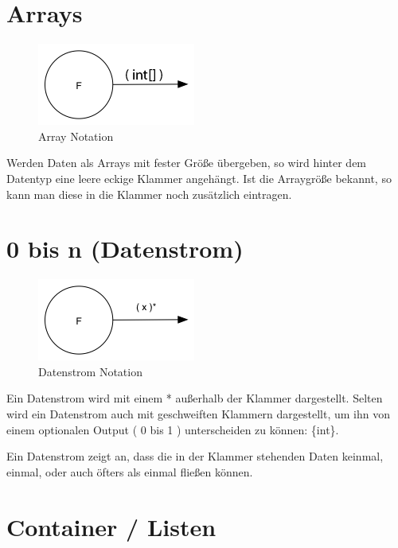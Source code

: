 \section{Arrays}

\begin{figure}[!htbp]
	\centering
		\includegraphics[width=.5\linewidth]{./img/diagramArray.png}
	\caption{Array Notation}
\end{figure}

Werden Daten als Arrays mit fester Größe übergeben, so wird hinter dem Datentyp eine leere eckige Klammer angehängt.
Ist die Arraygröße bekannt, so kann man diese in die Klammer noch zusätzlich eintragen.



\section{0 bis n (Datenstrom)}


\begin{figure}[!htbp]
	\centering
	\includegraphics[width=.5\linewidth]{./img/diagram0n.png}
	\caption{Datenstrom Notation}
\end{figure}



Ein Datenstrom wird mit einem * außerhalb der Klammer dargestellt.
Selten wird ein Datenstrom auch mit geschweiften Klammern dargestellt, um ihn
von einem optionalen Output ( 0 bis 1 ) unterscheiden zu können: \{int\}.

Ein Datenstrom zeigt an, dass die in der Klammer stehenden Daten keinmal,
einmal, oder auch öfters als einmal fließen können.

\section{Container / Listen}


